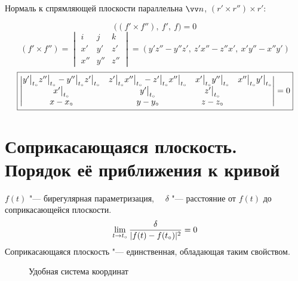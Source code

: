 Нормаль к спрямляющей плоскости параллельна $ \vv n $, \ie $ (r' \times r'') \times r' $:

$$ \bigg( (f' \times f''), ~ f', ~ f \bigg) = 0 $$
$$ (f' \times f'') =
\begin{vmatrix}
	i & j & k \\
    x' & y' & z' \\
    x'' & y'' & z''
\end{vmatrix} = (y'z'' - y''z', ~ z'x'' - z''x', ~ x'y'' - x''y') $$
$$ \boxed{
    \begin{vmatrix}
        y'\big|_{t_\circ}^{}z''\big|_{t_\circ}^{} - y''\big|_{t_\circ}^{}z'\big|_{t_\circ}^{} & z'\big|_{t_\circ}^{}x''\big|_{t_\circ}^{} - z'\big|_{t_\circ}^{}x''\big|_{t_\circ}^{} & x'\big|_{t_\circ}^{}y''\big|_{t_\circ}^{} & x''\big|_{t_\circ}^{}y'\big|_{t_\circ}^{} \\
        x'\big|_{t_\circ}^{} & y'\big|_{t_\circ}^{} & z'\big|_{t_\circ}^{} \\
        x - x_\circ & y - y_\circ & z - z_\circ
    \end{vmatrix} = 0} $$

\section{Соприкасающаяся плоскость. Порядок её приближения к \n кривой}

\begin{theorem}
	$ f(t) $ "--- бирегулярная параметризация, $ \quad \delta $ "--- расстояние от $ f(t) $ до соприкасающейся плоскости.
    $$ \lim\limits_{t \to t_\circ} \frac\delta{|f(t) - f(t_\circ)|^2} = 0 $$
    Соприкасающаяся плоскость "--- единственная, обладающая таким свойством.
\end{theorem}

\begin{figure}[!ht]
    \caption{Удобная система координат}
    \label{tikz:tangent_plane}
\end{figure}

